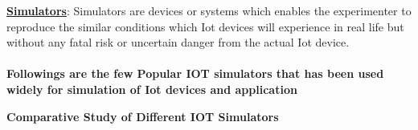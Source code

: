 \documentclass[a4paper,11pt]{article}
\begin{document}
\begin{iotsolution}

\textbf{\underline{Simulators}}: Simulators are devices or systems which enables the experimenter to reproduce the similar conditions which Iot devices will experience in real life but without any fatal risk or uncertain danger from the actual Iot device.\\\\
\textbf{Followings are the few Popular IOT simulators that has been used widely for simulation of Iot devices and application}

\begin{center}
    \textbf{Comparative Study of Different IOT Simulators }
\end{center}




\end{iotsolution}
\end{document}
